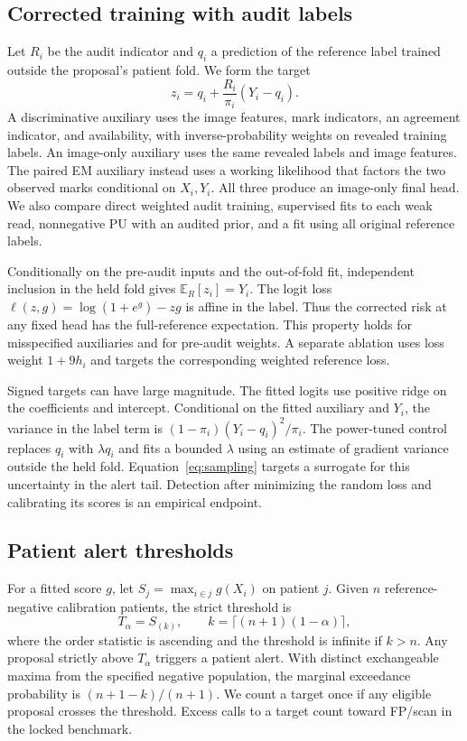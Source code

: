 \subsection{Corrected training with audit labels}

Let $R_i$ be the audit indicator and $q_i$ a prediction of the reference label trained outside the proposal's patient fold. We form the target
\begin{equation}
 z_i=q_i+\frac{R_i}{\pi_i}(Y_i-q_i).
 \label{eq:correction}
\end{equation}
A discriminative auxiliary uses the image features, mark indicators, an agreement indicator, and availability, with inverse-probability weights on revealed training labels. An image-only auxiliary uses the same revealed labels and image features. The paired EM auxiliary instead uses a working likelihood that factors the two observed marks conditional on $X_i,Y_i$. All three produce an image-only final head. We also compare direct weighted audit training, supervised fits to each weak read, nonnegative PU with an audited prior, and a fit using all original reference labels.

Conditionally on the pre-audit inputs and the out-of-fold fit, independent inclusion in the held fold gives $\mathbb E_R[z_i]=Y_i$. The logit loss $\ell(z,g)=\log(1+e^g)-zg$ is affine in the label. Thus the corrected risk at any fixed head has the full-reference expectation. This property holds for misspecified auxiliaries and for pre-audit weights. A separate ablation uses loss weight $1+9h_i$ and targets the corresponding weighted reference loss.

Signed targets can have large magnitude. The fitted logits use positive ridge on the coefficients and intercept. Conditional on the fitted auxiliary and $Y_i$, the variance in the label term is $(1-\pi_i)(Y_i-q_i)^2/\pi_i$. The power-tuned control replaces $q_i$ with $\lambda q_i$ and fits a bounded $\lambda$ using an estimate of gradient variance outside the held fold. Equation~\eqref{eq:sampling} targets a surrogate for this uncertainty in the alert tail. Detection after minimizing the random loss and calibrating its scores is an empirical endpoint.

\subsection{Patient alert thresholds}

For a fitted score $g$, let $S_j=\max_{i\in j}g(X_i)$ on patient $j$. Given $n$ reference-negative calibration patients, the strict threshold is
\begin{equation}
 T_\alpha=S_{(k)},\qquad k=\lceil(n+1)(1-\alpha)\rceil,
 \label{eq:threshold}
\end{equation}
where the order statistic is ascending and the threshold is infinite if $k>n$. Any proposal strictly above $T_\alpha$ triggers a patient alert. With distinct exchangeable maxima from the specified negative population, the marginal exceedance probability is $(n+1-k)/(n+1)$. We count a target once if any eligible proposal crosses the threshold. Excess calls to a target count toward FP/scan in the locked benchmark.

